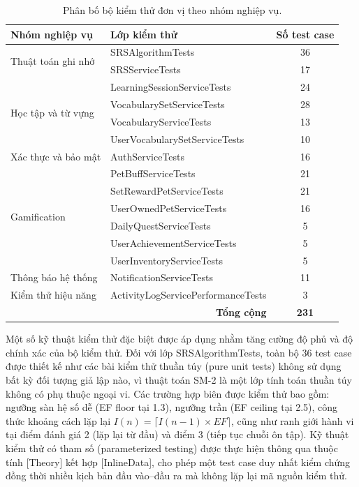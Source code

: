 \begin{table}[H]
\centering
\caption{Phân bố bộ kiểm thử đơn vị theo nhóm nghiệp vụ.}
\label{tab:unit_test_distribution}
\renewcommand{\arraystretch}{1.25}
\begin{tabular}{|l|l|c|}
\hline
\textbf{Nhóm nghiệp vụ} & \textbf{Lớp kiểm thử} & \textbf{Số test case} \\
\hline
\multirow{2}{*}{Thuật toán ghi nhớ} & SRSAlgorithmTests & 36 \\
\cline{2-3}
 & SRSServiceTests & 17 \\
\hline
\multirow{4}{*}{Học tập và từ vựng} & LearningSessionServiceTests & 24 \\
\cline{2-3}
 & VocabularySetServiceTests & 28 \\
\cline{2-3}
 & VocabularyServiceTests & 13 \\
\cline{2-3}
 & UserVocabularySetServiceTests & 10 \\
\hline
Xác thực và bảo mật & AuthServiceTests & 16 \\
\hline
\multirow{6}{*}{Gamification} & PetBuffServiceTests & 21 \\
\cline{2-3}
 & SetRewardPetServiceTests & 21 \\
\cline{2-3}
 & UserOwnedPetServiceTests & 16 \\
\cline{2-3}
 & DailyQuestServiceTests & 5 \\
\cline{2-3}
 & UserAchievementServiceTests & 5 \\
\cline{2-3}
 & UserInventoryServiceTests & 5 \\
\hline
Thông báo hệ thống & NotificationServiceTests & 11 \\
\hline
Kiểm thử hiệu năng & ActivityLogServicePerformanceTests & 3 \\
\hline
\multicolumn{2}{|r|}{\textbf{Tổng cộng}} & \textbf{231} \\
\hline
\end{tabular}
\end{table}

Một số kỹ thuật kiểm thử đặc biệt được áp dụng nhằm tăng cường độ phủ và độ chính xác của bộ kiểm thử. Đối với lớp SRSAlgorithmTests, toàn bộ 36 test case được thiết kế như các bài kiểm thử thuần túy (pure unit tests) không sử dụng bất kỳ đối tượng giả lập nào, vì thuật toán SM-2 là một lớp tính toán thuần túy không có phụ thuộc ngoại vi. Các trường hợp biên được kiểm thử bao gồm: ngưỡng sàn hệ số dễ (EF floor tại 1.3), ngưỡng trần (EF ceiling tại 2.5), công thức khoảng cách lặp lại $I(n) = \lceil I(n-1) \times EF \rceil$, cũng như ranh giới hành vi tại điểm đánh giá 2 (lặp lại từ đầu) và điểm 3 (tiếp tục chuỗi ôn tập). Kỹ thuật kiểm thử có tham số (parameterized testing) được thực hiện thông qua thuộc tính [Theory] kết hợp [InlineData], cho phép một test case duy nhất kiểm chứng đồng thời nhiều kịch bản đầu vào--đầu ra mà không lặp lại mã nguồn kiểm thử.

